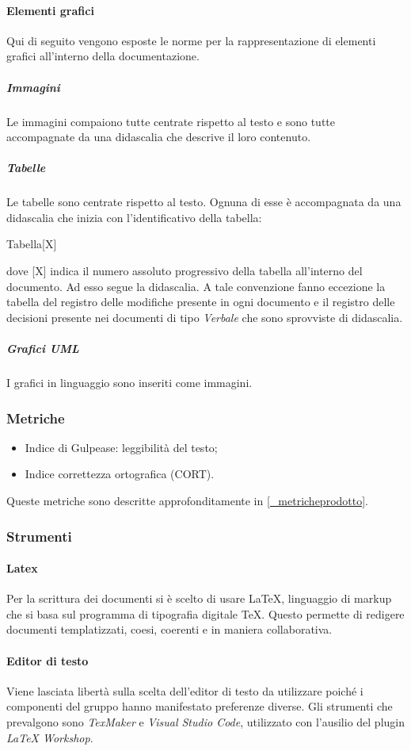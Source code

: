 \paragraph{Elementi grafici}
Qui di seguito vengono esposte le norme per la rappresentazione di elementi grafici all'interno della documentazione.
\subparagraph{Immagini}
Le immagini compaiono tutte centrate rispetto al testo e sono tutte accompagnate da una didascalia che descrive il loro contenuto.
\subparagraph{Tabelle}
Le tabelle sono centrate rispetto al testo. Ognuna di esse è accompagnata da una didascalia che inizia con l'identificativo della tabella:
\begin{center}
    Tabella[X]
\end{center}
dove [X] indica il numero assoluto progressivo della tabella all'interno del documento. Ad esso segue la  didascalia.  A tale convenzione fanno eccezione la tabella del registro delle modifiche presente in ogni documento e il registro delle decisioni presente nei documenti di tipo \textit{Verbale} che sono sprovviste di didascalia.
\subparagraph{Grafici UML}
I grafici in linguaggio  sono inseriti come immagini.

\subsubsection{Metriche}
\begin{itemize}
    \item Indice di Gulpease: leggibilità del testo;
    \item Indice correttezza ortografica (CORT).
\end{itemize}
Queste metriche sono descritte approfonditamente in \ref{_metricheprodotto}.

\subsubsection{Strumenti}
\paragraph{Latex}
Per la scrittura dei documenti si è scelto di usare \LaTeX, linguaggio di markup che si basa sul programma di tipografia digitale \TeX . Questo permette di redigere documenti templatizzati, coesi, coerenti e in maniera collaborativa.
\paragraph{Editor di testo}
Viene lasciata libertà sulla scelta dell'editor di testo da utilizzare poiché i componenti del gruppo hanno manifestato preferenze diverse. Gli strumenti che prevalgono sono \textit{TexMaker} e \textit{Visual Studio Code}, utilizzato con l'ausilio del plugin \textit{LaTeX Workshop}.
